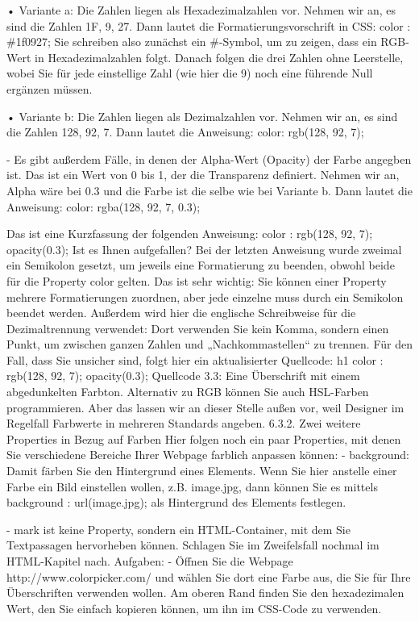 •	Variante a: Die Zahlen liegen als Hexadezimalzahlen vor. Nehmen wir an, es sind die Zahlen 1F, 9, 27. Dann lautet die Formatierungsvorschrift in CSS: 
color : \#1f0927;
Sie schreiben also zunächst ein \#-Symbol, um zu zeigen, dass ein RGB-Wert in Hexadezimalzahlen folgt. Danach folgen die drei Zahlen ohne Leerstelle, wobei Sie für jede einstellige Zahl (wie hier die 9) noch eine führende Null ergänzen müssen.

•	Variante b: Die Zahlen liegen als Dezimalzahlen vor. Nehmen wir an, es sind die Zahlen 128, 92, 7. Dann lautet die Anweisung:
color: rgb(128, 92, 7);

-	Es gibt außerdem Fälle, in denen der Alpha-Wert (Opacity) der Farbe angegben ist. Das ist ein Wert von 0 bis 1, der die Transparenz definiert. Nehmen wir an, Alpha wäre bei 0.3 und die Farbe ist die selbe wie bei Variante b. Dann lautet die Anweisung:
color: rgba(128, 92, 7, 0.3);

Das ist eine Kurzfassung der folgenden Anweisung:
color : rgb(128, 92, 7); opacity(0.3); 
Ist es Ihnen aufgefallen? Bei der letzten Anweisung wurde zweimal ein Semikolon gesetzt, um jeweils eine Formatierung zu beenden, obwohl beide für die Property color gelten. Das ist sehr wichtig: Sie können einer Property mehrere Formatierungen zuordnen, aber jede einzelne muss durch ein Semikolon beendet werden.
Außerdem wird hier die englische Schreibweise für die Dezimaltrennung verwendet: Dort verwenden Sie kein Komma, sondern einen Punkt, um zwischen ganzen Zahlen und „Nachkommastellen“ zu trennen.
Für den Fall, dass Sie unsicher sind, folgt hier ein aktualisierter Quellcode:
h1 {
	color : rgb(128, 92, 7); opacity(0.3);
}
Quellcode 3.3: Eine Überschrift mit einem abgedunkelten Farbton.
Alternativ zu RGB können Sie auch HSL-Farben programmieren. Aber das lassen wir an dieser Stelle außen vor, weil Designer im Regelfall Farbwerte in mehreren Standards angeben.
6.3.2.	Zwei weitere Properties in Bezug auf Farben
Hier folgen noch ein paar Properties, mit denen Sie verschiedene Bereiche Ihrer Webpage farblich anpassen können:
-	background: Damit färben Sie den Hintergrund eines Elements. Wenn Sie hier anstelle einer Farbe ein Bild einstellen wollen, z.B. image.jpg, dann können Sie es mittels 
background : url(image.jpg); 
als Hintergrund des Elements festlegen.

-	mark ist keine Property, sondern ein HTML-Container, mit dem Sie Textpassagen hervorheben können. Schlagen Sie im Zweifelsfall nochmal im HTML-Kapitel nach.
Aufgaben:
-	Öffnen Sie die Webpage http://www.colorpicker.com/ und wählen Sie dort eine Farbe aus, die Sie für Ihre Überschriften verwenden wollen. Am oberen Rand finden Sie den hexadezimalen Wert, den Sie einfach kopieren können, um ihn im CSS-Code zu verwenden.

